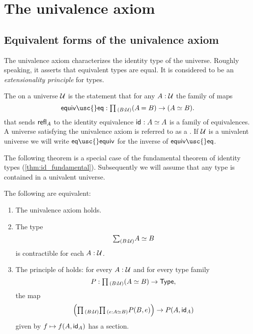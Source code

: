 \section{The univalence axiom}

\subsection{Equivalent forms of the univalence axiom}

The univalence axiom characterizes the identity type of the universe. Roughly speaking, it asserts that equivalent types are equal. It is considered to be an \emph{extensionality principle} for types.

\begin{defn}
  The  on a universe $\UU$ is the statement that for any $A:\UU$ the family of maps
\begin{equation*}
\mathsf{equiv\usc{}eq} : \prd{B:\UU} (\id{A}{B})\to(\eqv{A}{B}).
\end{equation*}
that sends $\refl{A}$ to the identity equivalence $\idfunc:\eqv{A}{A}$ is a family of equivalences. A universe satisfying the univalence axiom is referred to as a . If $\UU$ is a univalent universe we will write
$\mathsf{eq\usc{}equiv}$
for the inverse of $\mathsf{equiv\usc{}eq}$.
\end{defn}

The following theorem is a special case of the fundamental theorem of identity types (\cref{thm:id_fundamental}). Subsequently we will assume that any type is contained in a univalent universe.

\begin{thm}\label{thm:univalence}
The following are equivalent:
\begin{enumerate}
\item The univalence axiom holds.
\item The type
\begin{equation*}
\sm{B:\UU}\eqv{A}{B}
\end{equation*}
is contractible for each $A:\UU$.
\item The principle of  holds: for every $A:\UU$ and for every type family
\begin{equation*}
P:\prd{B:\UU} (\eqv{A}{B})\to \mathsf{Type},
\end{equation*}
the map
\begin{equation*}
\Big(\prd{B:\UU}{e:\eqv{A}{B}}P(B,e)\Big)\to P(A,\idfunc[A])
\end{equation*}
given by $f\mapsto f(A,\idfunc[A])$ has a section.
\end{enumerate}
\end{thm}

